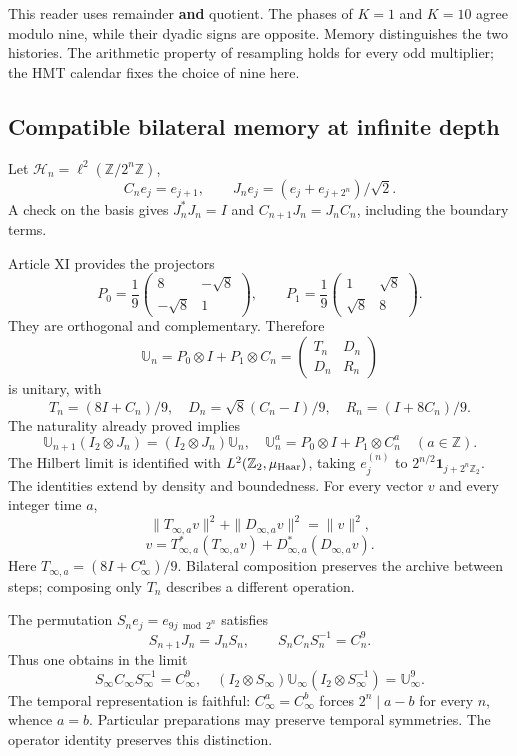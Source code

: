 This reader uses remainder \textbf{and} quotient. The phases of \(K=1\) and \(K=10\) agree modulo nine, while their dyadic signs are opposite. Memory distinguishes the two histories. The arithmetic property of resampling holds for every odd multiplier; the HMT calendar fixes the choice of nine here.


\subsection{Compatible bilateral memory at infinite depth}
\label{hmtfg:prolongacion:5}

Let \(\mathcal H_n=\ell^2(\mathbb Z/2^n\mathbb Z)\),
\[
C_ne_j=e_{j+1},\qquad
J_ne_j=(e_j+e_{j+2^n})/\sqrt2.
\]
A check on the basis gives \(J_n^*J_n=I\) and \(C_{n+1}J_n=J_nC_n\), including the boundary terms.

Article XI provides the projectors
\[
P_0=\frac19\begin{pmatrix}8&-\sqrt8\\-\sqrt8&1\end{pmatrix},\qquad
P_1=\frac19\begin{pmatrix}1&\sqrt8\\\sqrt8&8\end{pmatrix}.
\]
They are orthogonal and complementary. Therefore
\[
\mathbb U_n=P_0\otimes I+P_1\otimes C_n
=\begin{pmatrix}T_n&D_n\\D_n&R_n\end{pmatrix}
\]
is unitary, with
\[
T_n=(8I+C_n)/9,\quad D_n=\sqrt8(C_n-I)/9,\quad R_n=(I+8C_n)/9.
\]
The naturality already proved implies
\[
\mathbb U_{n+1}(I_2\otimes J_n)=(I_2\otimes J_n)\mathbb U_n,
\quad \mathbb U_n^a=P_0\otimes I+P_1\otimes C_n^a
\quad(a\in\mathbb Z).
\]
The Hilbert limit is identified with \(L^2(\mathbb Z_2,\mu_{\rm Haar})\), taking \(e_j^{(n)}\) to \(2^{n/2}\mathbf1_{j+2^n\mathbb Z_2}\). The identities extend by density and boundedness. For every vector \(v\) and every integer time \(a\),
\[
\boxed{\|T_{\infty,a}v\|^2+\|D_{\infty,a}v\|^2=\|v\|^2,}
\]
\[
\boxed{v=T_{\infty,a}^*(T_{\infty,a}v)+D_{\infty,a}^*(D_{\infty,a}v).}
\]
Here \(T_{\infty,a}=(8I+C_\infty^a)/9\). Bilateral composition preserves the archive between steps; composing only \(T_n\) describes a different operation.

The permutation \(S_ne_j=e_{9j\bmod2^n}\) satisfies
\[
S_{n+1}J_n=J_nS_n,\qquad S_nC_nS_n^{-1}=C_n^9.
\]
Thus one obtains in the limit
\[
S_\infty C_\infty S_\infty^{-1}=C_\infty^9,
\quad (I_2\otimes S_\infty)\mathbb U_\infty
(I_2\otimes S_\infty^{-1})=\mathbb U_\infty^9.
\]
The temporal representation is faithful: \(C_\infty^a=C_\infty^b\) forces \(2^n\mid a-b\) for every \(n\), whence \(a=b\). Particular preparations may preserve temporal symmetries. The operator identity preserves this distinction.


